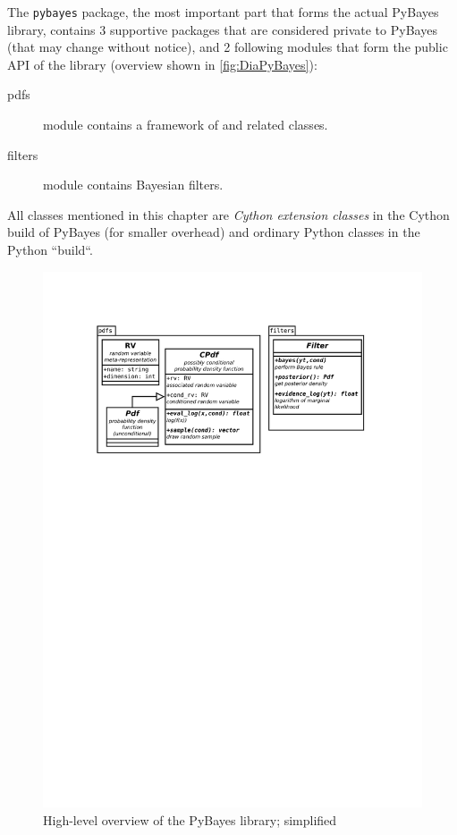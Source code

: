 The \verb|pybayes| package, the most important part that forms the actual PyBayes library, contains
3 supportive packages that are considered private to PyBayes (that may change without notice), and
2 following modules that form the public API of the library (overview shown in \autoref{fig:DiaPyBayes}):
\begin{description}
	\item[pdfs] module contains a framework of {\pdfs} and related classes.
	\item[filters] module contains Bayesian filters.
\end{description}

All classes mentioned in this chapter are \emph{Cython extension classes} in the Cython build of
PyBayes (for smaller overhead) and ordinary Python classes in the Python ``build``.

\begin{figure}[h]
	\centering
	\includegraphics[width=\textwidth,keepaspectratio=true,clip=true,trim=3cm 196mm 3cm 3cm]{./diagrams/PyBayes.pdf}
	\vspace{-8mm}
	\caption[High-level overview of the PyBayes library]{High-level overview of the PyBayes library;
	simplified}
	\label{fig:DiaPyBayes}
\end{figure}

